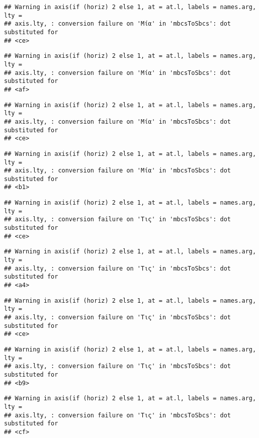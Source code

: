 \documentclass[
]{article}
\begin{document}
\begin{verbatim}
## Warning in axis(if (horiz) 2 else 1, at = at.l, labels = names.arg, lty =
## axis.lty, : conversion failure on 'Μία' in 'mbcsToSbcs': dot substituted for
## <ce>
\end{verbatim}

\begin{verbatim}
## Warning in axis(if (horiz) 2 else 1, at = at.l, labels = names.arg, lty =
## axis.lty, : conversion failure on 'Μία' in 'mbcsToSbcs': dot substituted for
## <af>
\end{verbatim}

\begin{verbatim}
## Warning in axis(if (horiz) 2 else 1, at = at.l, labels = names.arg, lty =
## axis.lty, : conversion failure on 'Μία' in 'mbcsToSbcs': dot substituted for
## <ce>
\end{verbatim}

\begin{verbatim}
## Warning in axis(if (horiz) 2 else 1, at = at.l, labels = names.arg, lty =
## axis.lty, : conversion failure on 'Μία' in 'mbcsToSbcs': dot substituted for
## <b1>
\end{verbatim}

\begin{verbatim}
## Warning in axis(if (horiz) 2 else 1, at = at.l, labels = names.arg, lty =
## axis.lty, : conversion failure on 'Τις' in 'mbcsToSbcs': dot substituted for
## <ce>
\end{verbatim}

\begin{verbatim}
## Warning in axis(if (horiz) 2 else 1, at = at.l, labels = names.arg, lty =
## axis.lty, : conversion failure on 'Τις' in 'mbcsToSbcs': dot substituted for
## <a4>
\end{verbatim}

\begin{verbatim}
## Warning in axis(if (horiz) 2 else 1, at = at.l, labels = names.arg, lty =
## axis.lty, : conversion failure on 'Τις' in 'mbcsToSbcs': dot substituted for
## <ce>
\end{verbatim}

\begin{verbatim}
## Warning in axis(if (horiz) 2 else 1, at = at.l, labels = names.arg, lty =
## axis.lty, : conversion failure on 'Τις' in 'mbcsToSbcs': dot substituted for
## <b9>
\end{verbatim}

\begin{verbatim}
## Warning in axis(if (horiz) 2 else 1, at = at.l, labels = names.arg, lty =
## axis.lty, : conversion failure on 'Τις' in 'mbcsToSbcs': dot substituted for
## <cf>
\end{verbatim}
\end{document}
